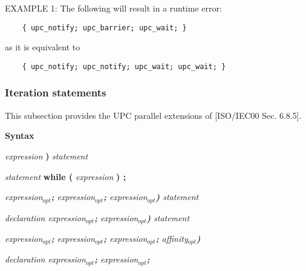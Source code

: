 \np EXAMPLE 1:  The following will result in a runtime error:  
\begin{verbatim}
    { upc_notify; upc_barrier; upc_wait; }                 
\end{verbatim}

    as it is equivalent to 

\begin{verbatim}
    { upc_notify; upc_notify; upc_wait; upc_wait; } 
\end{verbatim}

\subsubsection{Iteration statements}

\npf This subsection provides the UPC parallel extensions of
    [ISO/IEC00 Sec. 6.8.5].

{\bf Syntax} 


\hspace{3em}{\bf while (} {\em expression} {\bf )} {\em statement}

\hspace{3em}{\bf do} {\em statement} {\bf while (} {\em expression} {\bf ) ;}

\hspace{3em}{\bf for (} {\em expression$_{opt}${\bf ;} 
                         expression$_{opt}${\bf ;}
expression$_{opt}${\bf )} statement}

\hspace{3em}{\bf for (} {\em declaration expression$_{opt}${\bf ;} 
                         expression$_{opt}${\bf )} statement}

\hspace{3em}{\bf upc\_forall (} {\em expression$_{opt}${\bf ;} 
expression$_{opt}${\bf ;}
expression$_{opt}${\bf ;}
affinity$_{opt}${\bf )}}

\hspace{3em}{\bf upc\_forall (} {\em declaration expression$_{opt}${\bf ;} 
expression$_{opt}${\bf ;}}\\
                            


\hspace{3em}{\em expression}

\hspace{3em}{\bf continue }

